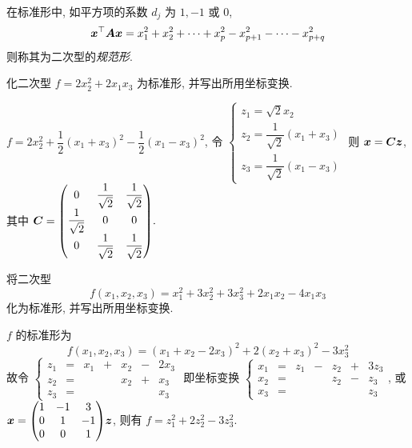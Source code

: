 \begin{definition}[二次型的规范形]
    在标准形中, 如平方项的系数 $ d_{j} $ 为 $ 1,-1 $ 或 $0$,
    $$\vb*{x}^{\top} \vb*{A} \vb*{x}=x_{1}^{2}+x_{2}^{2}+\cdots+x_{p}^{2}-x_{p+1}^{2}-\cdots-x_{p+q}^{2}$$
    则称其为二次型的\textit{规范形}.
\end{definition}

\begin{example}
    化二次型 $f=2x_2^2+2x_1x_3$ 为标准形, 并写出所用坐标变换.
\end{example}
\begin{solution}
    $f=2x_2^2+\dfrac{1}{2}(x_1+x_3)^2-\dfrac{1}{2}(x_1-x_3)^2$, 令
    $\begin{cases}
            z_1=\sqrt2x_2                  \\
            z_2=\dfrac{1}{\sqrt2}(x_1+x_3) \\[6pt]
            z_3=\dfrac{1}{\sqrt2}(x_1-x_3)
        \end{cases}$ 则 $\vb*{x}=\vb*{Cz}$, 
    其中 $\vb*{C}=\mqty(0&\dfrac{1}{\sqrt2}&\dfrac{1}{\sqrt2}\\[6pt]\dfrac{1}{\sqrt2}&0&0\\[6pt]0&\dfrac{1}{\sqrt{2}}&\dfrac{1}{\sqrt{2}}).$
\end{solution}

\begin{example}
    将二次型 $$f(x_1,x_2,x_3)=x_1^2+3x_2^2+3x_3^2+2x_1x_2-4x_1x_3$$ 化为标准形, 并写出所用坐标变换.
\end{example}
\begin{solution}
    $f$ 的标准形为 $$f(x_1,x_2,x_3)=(x_1+x_2-2x_3)^2+2(x_2+x_3)^2-3x_3^2$$
    故令 $\left\{\begin{matrix}
            z_1 & = & x_1 & + & x_2 & - & 2x_3 \\
            z_2 & = &     &   & x_2 & + & x_3  \\
            z_3 & = &     &   &     &   & x_3
        \end{matrix}\right.$ 即坐标变换 $\left\{\begin{matrix}
            x_1 & = & z_1 & - & z_2 & + & 3z_3 \\
            x_2 & = &     &   & z_2 & - & z_3  \\
            x_3 & = &     &   &     &   & z_3
        \end{matrix}\right.$, 或 $\vb*{x}=\mqty(1&-1&3\\0&1&-1\\0&0&1)\vb*{z}$, 则有 $f=z_1^2+2z_2^2-3z_3^2.$
\end{solution}

